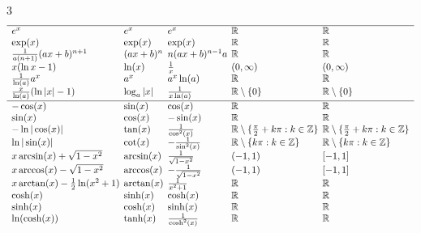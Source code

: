 \begin{multicols*}{3}
\[{\begin{array}{l@{\hspace{0.15cm}}l@{\hspace{0.15cm}}l@{\hspace{0.15cm}}l@{\hspace{0.15cm}}l}
\hline

e^x
& e^x
& e^x
& \mathbb R
& \mathbb R
\\

\exp(x)
& \exp(x)
& \exp(x)
& \mathbb R
& \mathbb R
\\

\frac{1}{a(n+1)}(ax+b)^{n+1}
& (ax+b)^n
& n(ax+b)^{n-1}a
& \mathbb R
& \mathbb R
\\

x(\ln x-1)
& \ln(x)
& \frac1x
& (0,\infty)
& (0,\infty)
\\

\frac1{\ln(a)}a^x
& a^x
& a^x\ln(a)
& \mathbb R
& \mathbb R
\\

\frac{x}{\ln(a)}(\ln|x|-1)
& \log_a|x|
& \frac1{x\ln(a)}
& \mathbb R\setminus\{0\}
& \mathbb R\setminus\{0\}
\\[0.1cm]

\hline 

-\cos(x)
& \sin(x)
& \cos(x)
& \mathbb R
& \mathbb R
\\

\sin(x)
& \cos(x)
& -\sin(x)
& \mathbb R
& \mathbb R
\\

-\ln|\cos(x)|
& \tan(x)
& \frac1{\cos^2(x)}
& \mathbb R\setminus
  \{\tfrac\pi2+k\pi:k\in\mathbb Z\}
& \mathbb R\setminus
  \{\tfrac\pi2+k\pi:k\in\mathbb Z\}
\\

\ln|\sin(x)|
& \cot(x)
& -\frac1{\sin^2(x)}
& \mathbb R\setminus\{k\pi:k\in\mathbb Z\}
& \mathbb R\setminus\{k\pi:k\in\mathbb Z\}
\\

x\arcsin(x)+\sqrt{1-x^2}
& \arcsin(x)
& \frac1{\sqrt{1-x^2}}
& (-1,1)
& [-1,1]
\\

x\arccos(x)-\sqrt{1-x^2}
& \arccos(x)
& -\frac1{\sqrt{1-x^2}}
& (-1,1)
& [-1,1]
\\

x\arctan(x)-\frac12\ln(x^2+1)
& \arctan(x)
& \frac1{x^2+1}
& \mathbb R
& \mathbb R
\\

\cosh(x)
& \sinh(x)
& \cosh(x)
& \mathbb R
& \mathbb R
\\

\sinh(x)
& \cosh(x)
& \sinh(x)
& \mathbb R
& \mathbb R
\\

\ln(\cosh(x))
& \tanh(x)
& \frac1{\cosh^2(x)}
& \mathbb R
& \mathbb R
\\


\end{array}}\]
\end{multicols*}
